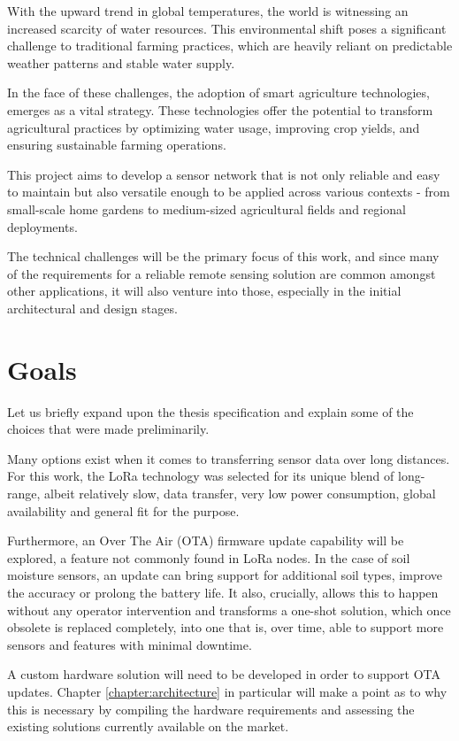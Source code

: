 
With the upward trend in global temperatures, the world is witnessing an increased scarcity of water resources. This environmental shift poses a significant challenge to traditional farming practices, which are heavily reliant on predictable weather patterns and stable water supply. 

In the face of these challenges, the adoption of smart agriculture technologies, emerges as a vital strategy. These technologies offer the potential to transform agricultural practices by optimizing water usage, improving crop yields, and ensuring sustainable farming operations.

This project aims to develop a sensor network that is not only reliable and easy to maintain but also versatile enough to be applied across various contexts - from small-scale home gardens to medium-sized agricultural fields and regional deployments. 

The technical challenges will be the primary focus of this work, and since many of the requirements for a reliable remote sensing solution are common amongst other applications, it will also venture into those, especially in the initial architectural and design stages. 

\section{Goals}
Let us briefly expand upon the thesis specification and explain some of the choices that were made preliminarily.

Many options exist when it comes to transferring sensor data over long distances. For this work, the LoRa technology was selected for its unique blend of long-range, albeit relatively slow, data transfer, very low power consumption, global availability and general fit for the purpose. 

Furthermore, an Over The Air (OTA) firmware update capability will be explored, a feature not commonly found in LoRa nodes. In the case of soil moisture sensors, an update can bring support for additional soil types, improve the accuracy or prolong the battery life. It also, crucially, allows this to happen without any operator intervention and transforms a one-shot solution, which once obsolete is replaced completely, into one that is, over time, able to support more sensors and features with minimal downtime.

A custom hardware solution will need to be developed in order to support OTA updates. Chapter \ref{chapter:architecture} in particular will make a point as to why this is necessary by compiling the hardware requirements and assessing the existing solutions currently available on the market.

